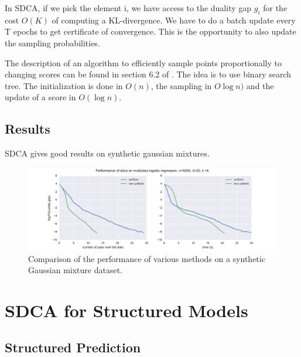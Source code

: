 \documentclass{article}
\DeclareMathOperator{\1}{\mathbb{1}}
\begin{document}
In SDCA, if we pick the element i, we have access to the duality gap $g_i$ for the cost $O(K)$ of computing a KL-divergence.
We have to do a batch update every T epochs to get certificate of convergence.
This is the opportunity to also update the sampling probabilities.

The description of an algorithm to efficiently sample points proportionally to changing scores can be found in section 6.2 of \cite{nesterov_efficiency_2012}.
The idea is to use binary search tree.
The initialization is done in $O(n)$, the sampling in $O\log n)$ and the update of a score in $O(\log n)$.

\subsection{Results}

SDCA gives good results on synthetic gaussian mixtures. 
\begin{figure}[ht]
	\label{gmm results}
	\includegraphics[width=\textwidth]{images/nonuniform_is_better.pdf}
	\caption{Comparison of the performance of various methods on a synthetic Gaussian mixture dataset.}
\end{figure}



\clearpage
\section{SDCA for Structured Models}

\subsection{Structured Prediction}
\end{document}
